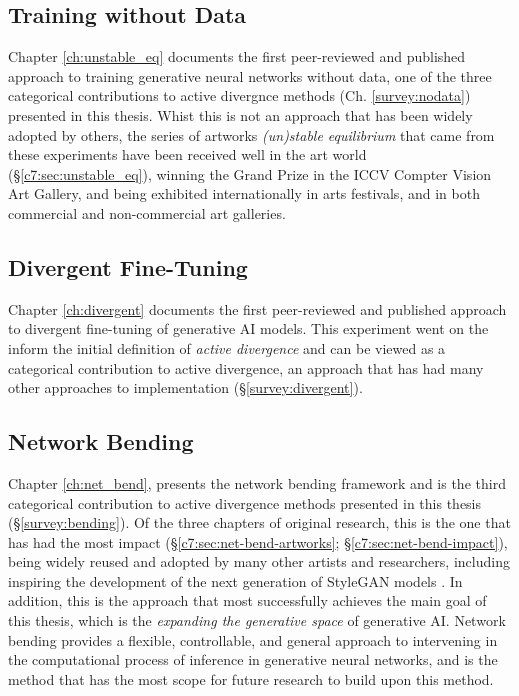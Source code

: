 \subsection{Training without Data}

Chapter \ref{ch:unstable_eq} documents the first peer-reviewed and published approach to training generative neural networks without data, one of the three categorical contributions to active divergnce methods (Ch. \ref{survey:nodata}) presented in this thesis.
Whist this is not an approach that has been widely adopted by others, the series of artworks \textit{(un)stable equilibrium} that came from these experiments have been received well in the art world (\S \ref{c7:sec:unstable_eq}), winning the Grand Prize in the ICCV Compter Vision Art Gallery, and being exhibited internationally in arts festivals, and in both commercial and non-commercial art galleries. 

\subsection{Divergent Fine-Tuning}

Chapter \ref{ch:divergent} documents the first peer-reviewed and published approach to divergent fine-tuning of generative AI models.
This experiment went on the inform the initial definition of \textit{active divergence} \citep{berns2020bridging} and can be viewed as a categorical contribution to active divergence, an approach that has had many other approaches to implementation (\S \ref{survey:divergent}).


\subsection{Network Bending}

Chapter \ref{ch:net_bend}, presents the network bending framework and is the third categorical contribution to active divergence methods presented in this thesis (\S \ref{survey:bending}).
Of the three chapters of original research, this is the one that has had the most impact  (\S \ref{c7:sec:net-bend-artworks}; \S \ref{c7:sec:net-bend-impact}), being widely reused and adopted by many other artists and researchers, including inspiring the development of the next generation of StyleGAN models \citep{karras2021alias}.
In addition, this is the approach that most successfully achieves the main goal of this thesis, which is the \textit{expanding the generative space} of generative AI. 
Network bending provides a flexible, controllable, and general approach to intervening in the computational process of inference in generative neural networks, and is the method that has the most scope for future research to build upon this method.


